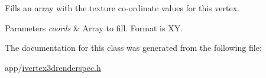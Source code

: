 Fills an array with the texture co-\/ordinate values for this vertex. 


\begin{DoxyParams}{Parameters}
{\em coords} & Array to fill. Format is X\-Y. \\
\hline
\end{DoxyParams}


The documentation for this class was generated from the following file\-:\begin{DoxyCompactItemize}
\item 
app/\hyperlink{ivertex3drenderspec_8h}{ivertex3drenderspec.\-h}\end{DoxyCompactItemize}
